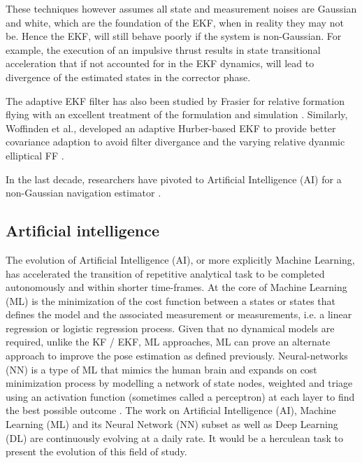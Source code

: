 These techniques however assumes all state and measurement noises are Gaussian and white, which are the foundation of the EKF, when in reality they may not be. Hence the EKF, will still behave poorly if the system is non-Gaussian. For example, the execution of an impulsive thrust results in state transitional acceleration that if not accounted for in the EKF dynamics, will lead to divergence of the estimated states in the corrector phase. 

The adaptive EKF filter has also been studied by Frasier for relative formation flying with an excellent treatment of the formulation and simulation \cite{frasierAdaptiveKF18}. Similarly, Woffinden et al., developed an adaptive Hurber-based EKF to provide better covariance adaption to avoid filter divergance and the varying relative dyanmic elliptical FF \cite{woffidenRez07}.


In the last decade, researchers have pivoted to Artificial Intelligence (AI) for a non-Gaussian navigation estimator \cite{}. 


\subsection{Artificial intelligence}\label{CHAP1_3_2}
The evolution of Artificial Intelligence (AI), or more explicitly Machine Learning, has accelerated the transition of repetitive analytical task to be completed autonomously and within shorter time-frames. At the core of Machine Learning (ML) is the minimization of the cost function between a states or states that defines the model and the associated measurement or measurements, i.e. a linear regression or logistic regression process. Given that no dynamical models are required, unlike the KF / EKF, ML approaches, ML can prove an alternate approach to improve the pose estimation as defined previously. Neural-networks (NN) is a type of ML that mimics the human brain and expands on cost minimization process by modelling a network of state nodes, weighted and triage using an activation function (sometimes called a perceptron) at each layer to find the best possible outcome \cite{yangML21}.
The work on Artificial Intelligence (AI), Machine Learning (ML) and its Neural Network (NN) subset as well as Deep Learning (DL) are continuously evolving at a daily rate. It would be a herculean task to present the evolution of this field of study. 


